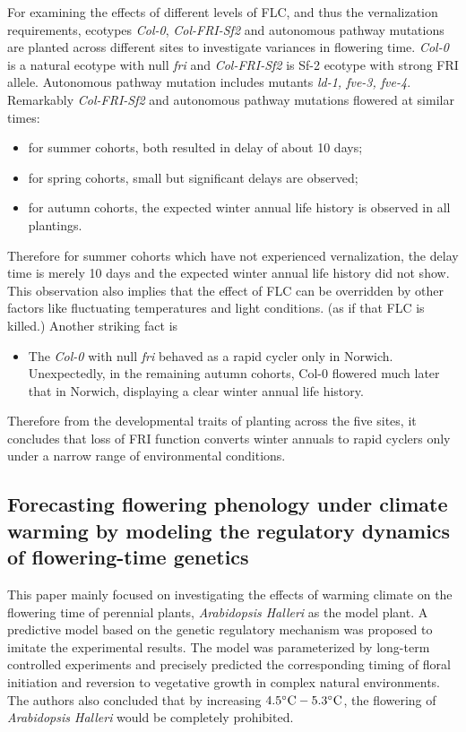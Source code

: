 \documentclass[paper=a4, fontsize=12pt]{scrartcl}	%
\numberwithin{equation}{section}					%
\numberwithin{figure}{section}					%
\numberwithin{table}{section}					%
\begin{document}
For examining the effects of different levels of FLC, and thus the vernalization requirements, ecotypes \emph{Col-0}, \emph{Col-FRI-Sf2} and autonomous pathway mutations are planted across different sites to investigate variances in flowering time. \emph{Col-0} is a natural ecotype with null \emph{fri} and \emph{Col-FRI-Sf2} is Sf-2 ecotype with strong FRI allele. Autonomous pathway mutation includes mutants \emph{ld-1, fve-3, fve-4}. Remarkably \emph{Col-FRI-Sf2}  and autonomous pathway mutations flowered at similar times: 
\begin{itemize}
\item for summer cohorts, both resulted in delay of about 10 days; 
\item for spring cohorts, small but significant delays are observed; 
\item for autumn cohorts, the expected winter annual life history is observed in all plantings. 
\end{itemize}
Therefore for summer cohorts which have not experienced vernalization, the delay time is merely 10 days and the expected winter annual life history did not show. This observation also implies that the effect of FLC can be overridden by other factors like fluctuating temperatures and light conditions. (as if that FLC is killed.) Another striking fact is 
\begin{itemize}
\item The \emph{Col-0} with null \emph{fri} behaved as a rapid cycler only in Norwich. Unexpectedly, in the remaining autumn cohorts, Col-0 flowered much later that in Norwich, displaying a clear winter annual life history. 
\end{itemize}
Therefore from the developmental traits of planting across the five sites, it concludes that loss of FRI function converts winter annuals to rapid cyclers only under a narrow range of environmental conditions. 

\subsection{Forecasting flowering phenology under climate warming by modeling the regulatory dynamics of flowering-time genetics \cite{satake2013}}
This paper mainly focused on investigating the effects of warming climate on the flowering time of perennial plants, \emph{Arabidopsis Halleri} as the model plant. A predictive model based on the genetic regulatory mechanism was proposed to imitate the experimental results. The model was parameterized by long-term controlled experiments and precisely predicted the corresponding timing of floral initiation and reversion to vegetative growth in complex natural environments. The authors also concluded that by increasing $4.5\celsius - 5.3\celsius$, the flowering of \emph{Arabidopsis Halleri} would be completely prohibited. 
\end{document}

